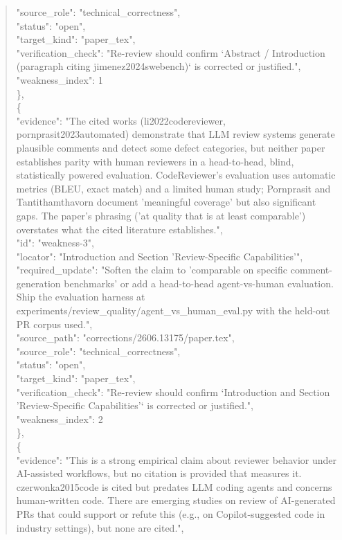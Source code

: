 \documentclass[11pt]{article}
\begin{document}
\begin{quote}
      "source\_role": "technical\_correctness",\\
      "status": "open",\\
      "target\_kind": "paper\_tex",\\
      "verification\_check": "Re-review should confirm `Abstract / Introduction (paragraph citing jimenez2024swebench)` is corrected or justified.",\\
      "weakness\_index": 1\\
    \},\\
    \{\\
      "evidence": "The cited works (li2022codereviewer, pornprasit2023automated) demonstrate that LLM review systems generate plausible comments and detect some defect categories, but neither paper establishes parity with human reviewers in a head-to-head, blind, statistically powered evaluation. CodeReviewer's evaluation uses automatic metrics (BLEU, exact match) and a limited human study; Pornprasit and Tantithamthavorn document 'meaningful coverage' but also significant gaps. The paper's phrasing ('at quality that is at least comparable') overstates what the cited literature establishes.",\\
      "id": "weakness-3",\\
      "locator": "Introduction and Section 'Review-Specific Capabilities'",\\
      "required\_update": "Soften the claim to 'comparable on specific comment-generation benchmarks' or add a head-to-head agent-vs-human evaluation. Ship the evaluation harness at experiments/review\_quality/agent\_vs\_human\_eval.py with the held-out PR corpus used.",\\
      "source\_path": "corrections/2606.13175/paper.tex",\\
      "source\_role": "technical\_correctness",\\
      "status": "open",\\
      "target\_kind": "paper\_tex",\\
      "verification\_check": "Re-review should confirm `Introduction and Section 'Review-Specific Capabilities'` is corrected or justified.",\\
      "weakness\_index": 2\\
    \},\\
    \{\\
      "evidence": "This is a strong empirical claim about reviewer behavior under AI-assisted workflows, but no citation is provided that measures it. czerwonka2015code is cited but predates LLM coding agents and concerns human-written code. There are emerging studies on review of AI-generated PRs that could support or refute this (e.g., on Copilot-suggested code in industry settings), but none are cited.",\\

\end{quote}
\end{document}
